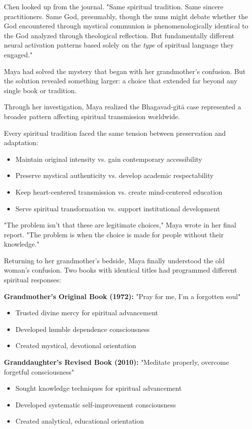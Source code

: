 \documentclass[12pt,twoside]{book}
\begin{document}
Chen looked up from the journal. "Same spiritual tradition. Same sincere practitioners. Same God, presumably, though the nuns might debate whether the God encountered through mystical communion is phenomenologically identical to the God analyzed through theological reflection. But fundamentally different neural activation patterns based solely on the \emph{type} of spiritual language they engaged."

Maya had solved the mystery that began with her grandmother's confusion. But the solution revealed something larger: a choice that extended far beyond any single book or tradition.


Through her investigation, Maya realized the Bhagavad-gītā case represented a broader pattern affecting spiritual transmission worldwide.

Every spiritual tradition faced the same tension between preservation and adaptation:
\begin{itemize}
\item Maintain original intensity vs. gain contemporary accessibility
\item Preserve mystical authenticity vs. develop academic respectability
\item Keep heart-centered transmission vs. create mind-centered education
\item Serve spiritual transformation vs. support institutional development
\end{itemize}

"The problem isn't that these are legitimate choices," Maya wrote in her final report. "The problem is when the choice is made for people without their knowledge."

Returning to her grandmother's bedside, Maya finally understood the old woman's confusion. Two books with identical titles had programmed different spiritual responses:

\textbf{\textbf{Grandmother's Original Book (1972):}}
"Pray for me, I'm a forgotten soul"
\begin{itemize}
\item Trusted divine mercy for spiritual advancement
\item Developed humble dependence consciousness
\item Created mystical, devotional orientation
\end{itemize}

\textbf{\textbf{Granddaughter's Revised Book (2010):}}
"Meditate properly, overcome forgetful consciousness"  
\begin{itemize}
\item Sought knowledge techniques for spiritual advancement
\item Developed systematic self-improvement consciousness
\item Created analytical, educational orientation
\end{itemize}
\end{document}
